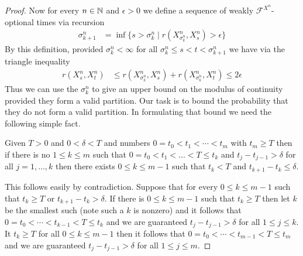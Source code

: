 \begin{proof}
Now for every $n \in \mathbb{N}$ and $\epsilon > 0$ we define a sequence of weakly $\mathcal{F}^{X^n}$-optional times via recursion
\begin{align*}
\sigma^n_{k+1} &= \inf \lbrace s > \sigma^n_k \mid r(X^n_{\sigma^n_k}, X^n_s) > \epsilon \rbrace
\end{align*}
By this definition, provided $\sigma^n_k <\infty$ for all $\sigma^n_k \leq s < t < \sigma^n_{k+1}$ we have via the triangle inequality
\begin{align*}
r(X^n_s, X^n_t) &\leq r(X^n_{\sigma^n_k}, X^n_s) + r(X^n_{\sigma^n_k}, X^n_t) \leq 2\epsilon
\end{align*}
Thus we can use the $\sigma^n_k$ to give an upper bound on the modulus of continuity provided they form a valid partition.  Our task is to bound the probability that they do not form a valid partition.  In formulating that bound we need the following simple fact.
\begin{clm} Given $T > 0$ and $0 < \delta < T$ and numbers $0=t_0 < t_1 < \dotsb < t_m$ with $t_m \geq T$ then if there is no $1 \leq k \leq m$ such that
$0=t_0 < t_1 < \dots < T \leq t_k$ and $t_{j}-t_{j-1}>\delta$ for all $j=1, \dotsc, k$ then there exists $0 \leq k \leq m-1$ such that $t_k < T$ and $t_{k+1} - t_k \leq \delta$.
\end{clm}
This follows easily by contradiction.  Suppose that for every $0 \leq k \leq m-1$ such that $t_k \geq T$ or $t_{k+1} - t_k > \delta$.  If there is $0 \leq k \leq m-1$ such that $t_k \geq T$ then let $k$ be the smallest such (note such a $k$ is nonzero) and it follows that $0=t_0 < \dotsb < t_{k-1} < T \leq t_k$ and we are guaranteed $t_{j}-t_{j-1} > \delta$ for all $1 \leq j \leq k$.  It $t_k \geq T$ for all $0\leq k \leq m-1$ then it follows that $0=t_0 < \dotsb < t_{m-1} < T \leq t_m$ and we are guaranteed $t_{j}-t_{j-1} > \delta$ for all $1 \leq j \leq m$.


\end{proof}
